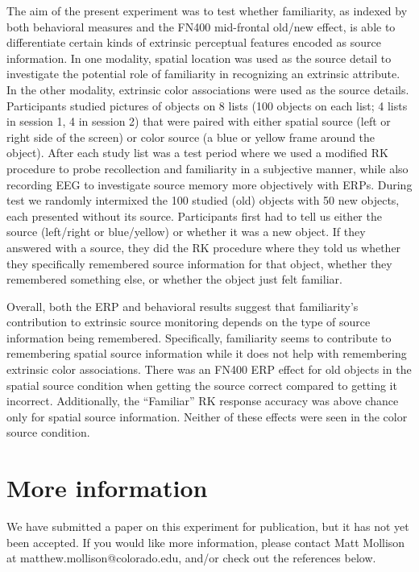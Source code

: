 \documentclass[12pt,doc]{apa}
\begin{document}
The aim of the present experiment was to test whether familiarity, as
indexed by both behavioral measures and the FN400 mid-frontal old/new
effect, is able to differentiate certain kinds of extrinsic perceptual
features encoded as source information.  In one modality, spatial
location was used as the source detail to investigate the potential
role of familiarity in recognizing an extrinsic attribute.  In the
other modality, extrinsic color associations were used as the source
details.  Participants studied pictures of objects on 8 lists (100
objects on each list; 4 lists in session 1, 4 in session 2) that were
paired with either spatial source (left or right side of the screen)
or color source (a blue or yellow frame around the object).  After
each study list was a test period where we used a modified RK
procedure to probe recollection and familiarity in a subjective
manner, while also recording EEG to investigate source memory more
objectively with ERPs.  During test we randomly intermixed the 100
studied (old) objects with 50 new objects, each presented without its
source.  Participants first had to tell us either the source
(left/right or blue/yellow) or whether it was a new object.  If they
answered with a source, they did the RK procedure where they told us
whether they specifically remembered source information for that
object, whether they remembered something else, or whether the object
just felt familiar.

Overall, both the ERP and behavioral results suggest that
familiarity's contribution to extrinsic source monitoring depends on
the type of source information being remembered.  Specifically,
familiarity seems to contribute to remembering spatial source
information while it does not help with remembering extrinsic color
associations.  There was an FN400 ERP effect for old objects in the
spatial source condition when getting the source correct compared to
getting it incorrect.  Additionally, the ``Familiar'' RK response
accuracy was above chance only for spatial source information.
Neither of these effects were seen in the color source condition.

\section*{More information}

We have submitted a paper on this experiment for publication, but it
has not yet been accepted.  If you would like more information, please
contact Matt Mollison at matthew.mollison@colorado.edu, and/or check
out the references below.



%
\end{document}
